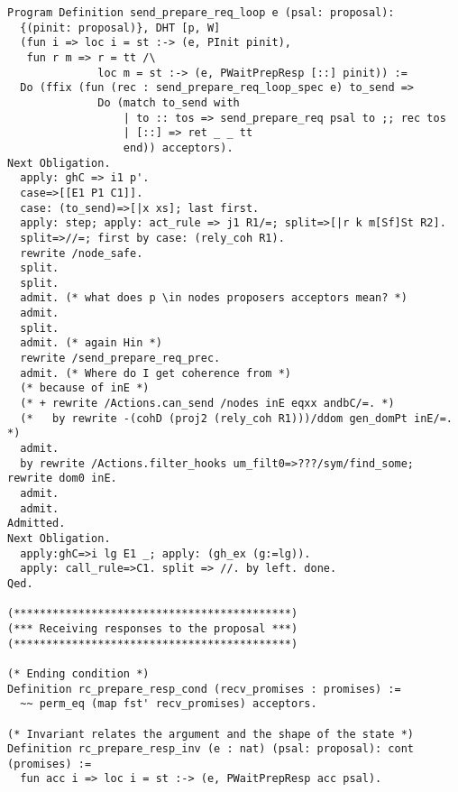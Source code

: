 \begin{landscape}
\begin{multicols*}{2}
\begin{lstlisting}[style=SourceCodeListing]
Program Definition send_prepare_req_loop e (psal: proposal):
  {(pinit: proposal)}, DHT [p, W]
  (fun i => loc i = st :-> (e, PInit pinit),
   fun r m => r = tt /\
              loc m = st :-> (e, PWaitPrepResp [::] pinit)) :=
  Do (ffix (fun (rec : send_prepare_req_loop_spec e) to_send =>
              Do (match to_send with
                  | to :: tos => send_prepare_req psal to ;; rec tos
                  | [::] => ret _ _ tt
                  end)) acceptors).
Next Obligation.
  apply: ghC => i1 p'.
  case=>[[E1 P1 C1]].
  case: (to_send)=>[|x xs]; last first.
  apply: step; apply: act_rule => j1 R1/=; split=>[|r k m[Sf]St R2].
  split=>//=; first by case: (rely_coh R1).
  rewrite /node_safe.
  split.
  split.
  admit. (* what does p \in nodes proposers acceptors mean? *)
  admit.
  split.
  admit. (* again Hin *)
  rewrite /send_prepare_req_prec.
  admit. (* Where do I get coherence from *)
  (* because of inE *)
  (* + rewrite /Actions.can_send /nodes inE eqxx andbC/=. *)
  (*   by rewrite -(cohD (proj2 (rely_coh R1)))/ddom gen_domPt inE/=. *)
  admit.
  by rewrite /Actions.filter_hooks um_filt0=>???/sym/find_some; rewrite dom0 inE.
  admit.
  admit.
Admitted.
Next Obligation.
  apply:ghC=>i lg E1 _; apply: (gh_ex (g:=lg)).
  apply: call_rule=>C1. split => //. by left. done.
Qed.

(*******************************************)
(*** Receiving responses to the proposal ***)
(*******************************************)

(* Ending condition *)
Definition rc_prepare_resp_cond (recv_promises : promises) :=
  ~~ perm_eq (map fst' recv_promises) acceptors.

(* Invariant relates the argument and the shape of the state *)
Definition rc_prepare_resp_inv (e : nat) (psal: proposal): cont (promises) :=
  fun acc i => loc i = st :-> (e, PWaitPrepResp acc psal).


\end{lstlisting}
\end{multicols*}
\end{landscape}

